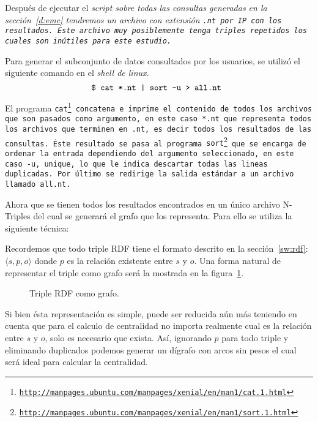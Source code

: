 Después de ejecutar el \it{script} sobre todas las consultas generadas en la
sección~\ref{d:emc} tendremos un archivo con extensión \tt{.nt} por IP
con los resultados.
Este archivo muy posiblemente tenga triples repetidos los cuales son inútiles
para este estudio.

Para generar el subconjunto de datos consultados por los usuarios, se utilizó el
siguiente comando en el \it{shell} de \it{linux}.
$$\tt{\$ cat *.nt | sort -u > all.nt }$$

El programa \tt{cat}\footnote{
  \url{http://manpages.ubuntu.com/manpages/xenial/en/man1/cat.1.html}} 
concatena e imprime el contenido de todos los archivos que
son pasados como argumento, en este caso \tt{*.nt} que representa todos los
archivos que terminen en \tt{.nt}, es decir todos los resultados de las
consultas.
Éste resultado se pasa al programa \tt{sort}\footnote{
  \url{http://manpages.ubuntu.com/manpages/xenial/en/man1/sort.1.html}}
que se encarga de ordenar la entrada dependiendo del argumento seleccionado, en
este caso \tt{-u}, \tt{unique}, lo que le indica descartar todas las lineas
duplicadas. Por último se redirige la salida estándar a un archivo llamado
\tt{all.nt}.

Ahora que se tienen todos los resultados encontrados en un único archivo
N-Triples del cual se generará el grafo que los representa.
Para ello se utiliza la siguiente técnica:

Recordemos que todo triple RDF tiene el formato descrito en la
sección~\ref{sw:rdf}: $\langle s,p,o\rangle$
donde $p$ es la relación existente entre $s$ y $o$. Una forma natural de
representar el triple como grafo será la mostrada en la
figura~\ref{fig:rdfgraphsimple}.

\begin{figure}[htpb]
  \centering
  \caption{Triple RDF como grafo.}
  \label{fig:rdfgraphsimple}
\end{figure}

Si bien ésta representación es simple, puede ser reducida aún más teniendo en
cuenta que para el calculo de centralidad no importa realmente cual es la
relación entre $s$ y $o$, solo es necesario que exista. Así, ignorando $p$ para
todo triple y eliminando duplicados podemos generar un dígrafo con arcos sin
pesos el cual será ideal para calcular la centralidad.

